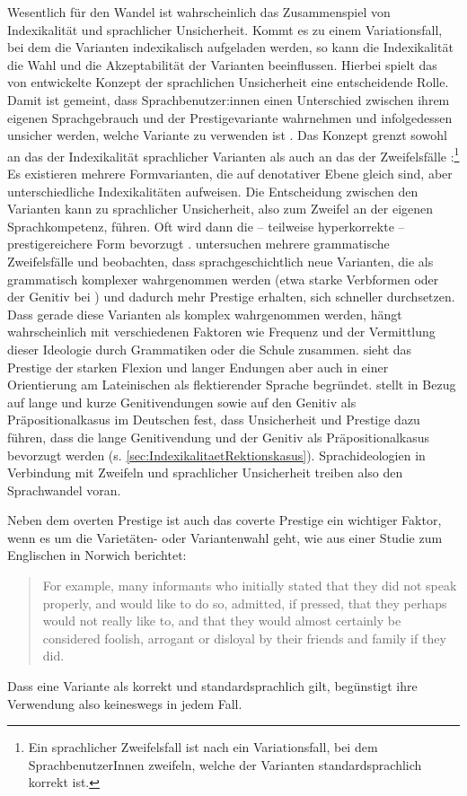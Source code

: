 Wesentlich für den Wandel ist wahrscheinlich das Zusammenspiel von Indexikalität und sprachlicher Unsicherheit. 
Kommt es zu einem Variationsfall, bei dem die Varianten indexikalisch aufgeladen werden, so kann die Indexikalität die Wahl und die Akzeptabilität der Varianten beeinflussen. 
Hierbei spielt das von \citet{Labov2006} entwickelte Konzept der sprachlichen Unsicherheit eine entscheidende Rolle. 
Damit ist gemeint, dass Sprachbenutzer:innen einen Unterschied zwischen ihrem eigenen Sprachgebrauch und der Prestigevariante wahrnehmen und infolgedessen unsicher werden, welche Variante zu verwenden ist \citep[s.][]{Labov2006}. 
Das Konzept grenzt sowohl an das der Indexikalität sprachlicher Varianten als auch an das der Zweifelsfälle \citep[s.][7]{Klein2003}:\footnote{Ein sprachlicher Zweifelsfall ist nach \citet[7]{Klein2003} ein Variationsfall, bei dem {Sprach\-be\-nutzerIn\-nen} zweifeln, welche der Varianten standardsprachlich korrekt ist.}
Es existieren mehrere Formvarianten, die auf denotativer Ebene gleich sind, aber unterschiedliche Indexikalitäten aufweisen. 
Die Entscheidung zwischen den Varianten kann zu sprachlicher Unsicherheit, also zum Zweifel an der eigenen Sprachkompetenz, führen. 
Oft wird dann die -- teilweise hyperkorrekte -- prestigereichere Form bevorzugt \citep[s.][326]{BaldaquiEscandellJosepM.2011}. 
\citet{Baumann2014} untersuchen mehrere grammatische Zweifelsfälle und beobachten, dass sprachgeschichtlich neue Varianten, die als grammatisch komplexer wahrgenommen werden (etwa starke Verbformen oder der Genitiv bei ) und dadurch mehr Prestige erhalten, sich schneller durchsetzen.
Dass gerade diese Varianten als komplex wahrgenommen werden, hängt wahrscheinlich mit verschiedenen Faktoren wie Frequenz und der Vermittlung dieser Ideologie durch Grammatiken oder die Schule zusammen. 
\citet[10]{Elspa2005} sieht das Prestige der starken Flexion und langer Endungen aber auch in einer Orientierung am Lateinischen als flektierender Sprache begründet. 
\citet[48]{Szczepaniak2014} stellt in Bezug auf lange und kurze Genitivendungen sowie auf den Genitiv als Präpositionalkasus im Deutschen fest, dass Unsicherheit und Prestige dazu führen, dass die lange Genitivendung und der Genitiv als Präpositionalkasus bevorzugt werden (s. \autoref{sec:IndexikalitaetRektionskasus}). 
Sprachideologien in Verbindung mit Zweifeln und sprachlicher Unsicherheit treiben also den Sprachwandel voran. 

Neben dem overten Prestige ist auch das coverte Prestige ein wichtiger Faktor, wenn es um die Varietäten- oder Variantenwahl geht, wie \citet[]{Trudgill.1972} aus einer Studie zum Englischen in Norwich berichtet: 
\begin{quote} For example, many informants who initially stated that they did not speak properly, and would like to do so, admitted, if pressed, that they perhaps would not really like to, and that they would almost certainly be considered foolish, arrogant or disloyal by their friends and family if they did.~\citep[184]{Trudgill.1972}\end{quote}
Dass eine Variante als korrekt und standardsprachlich gilt, begünstigt ihre Verwendung also keineswegs in jedem Fall.

